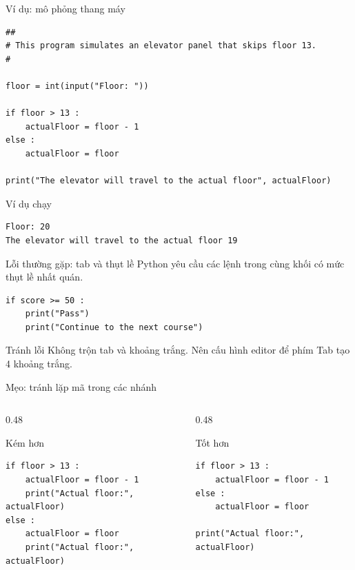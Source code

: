 \documentclass[aspectratio=169,11pt]{beamer}
\begin{document}
\begin{frame}[fragile]{Ví dụ: mô phỏng thang máy}
\begin{lstlisting}[style=py]
##
# This program simulates an elevator panel that skips floor 13.
#

floor = int(input("Floor: "))

if floor > 13 :
    actualFloor = floor - 1
else :
    actualFloor = floor

print("The elevator will travel to the actual floor", actualFloor)
\end{lstlisting}
\begin{block}{Ví dụ chạy}
\begin{lstlisting}[style=text]
Floor: 20
The elevator will travel to the actual floor 19
\end{lstlisting}
\end{block}
\end{frame}

\begin{frame}[fragile]{Lỗi thường gặp: tab và thụt lề}
Python yêu cầu các lệnh trong cùng khối có mức thụt lề nhất quán.
\begin{lstlisting}[style=py]
if score >= 50 :
    print("Pass")
    print("Continue to the next course")
\end{lstlisting}
\begin{alertblock}{Tránh lỗi}
Không trộn tab và khoảng trắng. Nên cấu hình editor để phím Tab tạo 4 khoảng trắng.
\end{alertblock}
\end{frame}

\begin{frame}[fragile]{Mẹo: tránh lặp mã trong các nhánh}
\begin{columns}[T]
\begin{column}{0.48\textwidth}
\begin{alertblock}{Kém hơn}
\begin{lstlisting}[style=py]
if floor > 13 :
    actualFloor = floor - 1
    print("Actual floor:", actualFloor)
else :
    actualFloor = floor
    print("Actual floor:", actualFloor)
\end{lstlisting}
\end{alertblock}
\end{column}
\begin{column}{0.48\textwidth}
\begin{exampleblock}{Tốt hơn}
\begin{lstlisting}[style=py]
if floor > 13 :
    actualFloor = floor - 1
else :
    actualFloor = floor

print("Actual floor:", actualFloor)
\end{lstlisting}
\end{exampleblock}
\end{column}
\end{columns}
\end{frame}
\end{document}
